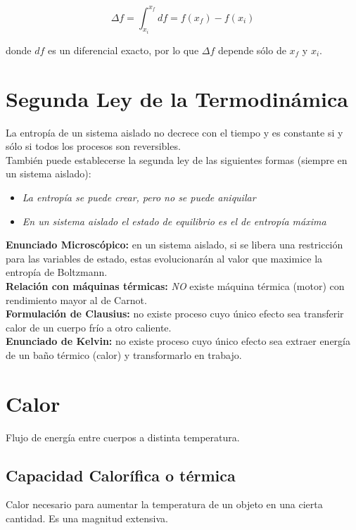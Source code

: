 \[\Delta f = \int^{x_f}_{x_i}df = f(x_f)-f(x_i)\]

donde $df$ es un diferencial exacto, por lo que $\Delta f$ depende sólo de $x_f$ y $x_i$.

\section{Segunda Ley de la Termodinámica}
\label{2ley}
La entropía de un sistema aislado no decrece con el tiempo y es constante si y sólo si todos los procesos son reversibles.\\

También puede establecerse la segunda ley de las siguientes formas (siempre en un sistema aislado):
\begin{itemize}
    \item \textit{La entropía se puede crear, pero no se puede aniquilar}
    \item \textit{En un sistema aislado el estado de equilibrio es el de entropía máxima}
\end{itemize}

\textbf{Enunciado Microscópico:} en un sistema aislado, si se libera una restricción para las variables de estado, estas evolucionarán al valor que maximice la entropía de Boltzmann.\\

\textbf{Relación con máquinas térmicas:} \textit{NO} existe máquina térmica (motor) con rendimiento mayor al de Carnot. \label{2ley-motor}\\

\textbf{Formulación de Clausius:} no existe proceso cuyo único efecto sea transferir calor de un cuerpo frío a otro caliente.\\

\textbf{Enunciado de Kelvin:} no existe proceso cuyo único efecto sea extraer energía de un baño térmico (calor) y transformarlo en trabajo.

\section{Calor}

Flujo de energía entre cuerpos a distinta temperatura.

\subsection{Capacidad Calorífica o térmica}

Calor necesario para aumentar la temperatura de un objeto en una cierta cantidad. Es una magnitud extensiva.

